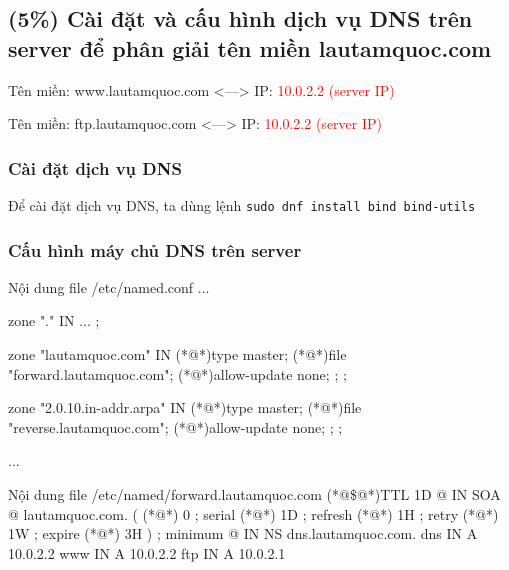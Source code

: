 \subsection{(5\%) Cài đặt và cấu hình dịch vụ DNS trên server để phân giải tên miền
  lautamquoc.com}

Tên miền: www.lautamquoc.com <---> IP: \textcolor{red}{10.0.2.2 (server IP)}

Tên miền: ftp.lautamquoc.com <---> IP: \textcolor{red}{10.0.2.2 (server IP)}


\subsubsection{Cài đặt dịch vụ DNS}
Để cài đặt dịch vụ DNS, ta dùng lệnh \texttt{sudo dnf install bind bind-utils}

\subsubsection{Cấu hình máy chủ DNS trên server}


\begin{coding}{Nội dung file /etc/named.conf}
  ...

  zone "." IN {
      ...
    };

  zone "lautamquoc.com" IN {
  (*@\qquad@*)type master;
  (*@\qquad@*)file "forward.lautamquoc.com";
  (*@\qquad@*)allow-update { none; };
  };

  zone "2.0.10.in-addr.arpa" IN {
  (*@\qquad@*)type master;
  (*@\qquad@*)file "reverse.lautamquoc.com";
  (*@\qquad@*)allow-update { none; };
  };

  ...
\end{coding}


\begin{coding}{Nội dung file /etc/named/forward.lautamquoc.com}
  (*@\$@*)TTL 1D
  @       IN SOA      @       lautamquoc.com. (
  (*@\qquad@*)                                0       ; serial
  (*@\qquad@*)                                1D      ; refresh
  (*@\qquad@*)                                1H      ; retry
  (*@\qquad@*)                                1W      ; expire
  (*@\qquad@*)                                3H )    ; minimum
  @       IN NS       dns.lautamquoc.com.
  dns     IN A        10.0.2.2
  www     IN A        10.0.2.2
  ftp     IN A        10.0.2.1
\end{coding}



